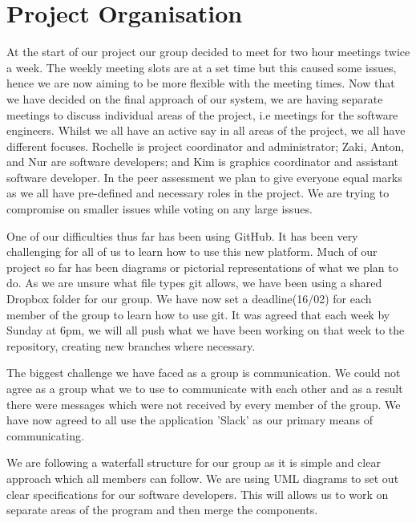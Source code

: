\documentclass[11pt]{article}
\begin{document}
	\section{Project Organisation}
		At the start of our project our group decided to meet for two hour meetings twice a week. 
		The weekly meeting slots are at a set time but this caused some issues, hence we are now aiming to be more flexible with the meeting times. 
		Now that we have decided on the final approach of our system, we are having separate meetings to discuss individual areas of the project, i.e meetings for the software engineers. 
		Whilst we all have an active say in all areas of the project, we all have different focuses. 
		Rochelle is project coordinator and administrator; Zaki, Anton, and Nur are software developers; and Kim is graphics coordinator and assistant software developer. 
		In the peer assessment we plan to give everyone equal marks as we all have pre-defined and necessary roles in the project. 
		We are trying to compromise on smaller issues while voting on any large issues. 
		 
		One of our difficulties thus far has been using GitHub. 
		It has been very challenging for all of us to learn how to use this new platform. 
		Much of our project so far has been diagrams or pictorial representations of what we plan to do. 
		As we are unsure what file types git allows, we have been using a shared Dropbox folder for our group. 
		We have now set a deadline(16/02) for each member of the group to learn how to use git. 
		It was agreed that each week by Sunday at 6pm, we will all push what we have been working on that week to the repository, creating new branches where necessary. 
		
		The biggest challenge we have faced as a group is communication. 
		We could not agree as a group what we to use to communicate with each other and as a result there were messages which were not received by every member of the group. 
		We have now agreed to all use the application 'Slack' as our primary means of communicating. 
		
		We are following a waterfall structure for our group as it is simple and clear approach which all members can follow. 
		We are using UML diagrams to set out clear specifications for our software developers. 
		This will allows us to work on separate areas of the program and then merge the components.  
	
\end{document}
